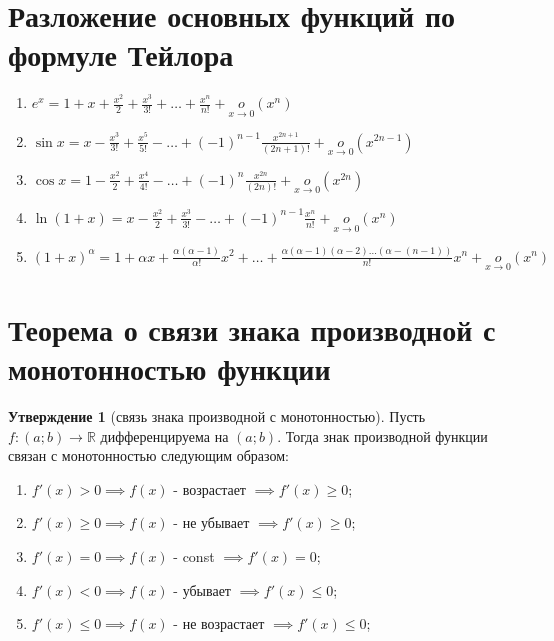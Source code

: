 \documentclass{report}
\theoremstyle{definition}
\newtheorem*{statement}{Утверждение}
\begin{document}
\section{Разложение основных функций по формуле Тейлора}

\begin{enumerate}
    \item $e^x = 1 + x + \frac{x^2}{2} + \frac{x^3}{3!} + \ldots + \frac{x^n}{n!} + \underset{x\rightarrow0}
              {o}(x^n)$
    \item $\sin x = x - \frac{x^3}{3!} + \frac{x^5}{5!} - \ldots + (-1)^{n-1}\frac{x^{2n+1}}{(2n+1)!} +
              \underset{x\rightarrow0}{o}(x^{2n-1})$
    \item $\cos x = 1 - \frac{x^2}{2} + \frac{x^4}{4!} - \ldots + (-1)^n\frac{x^{2n}}{(2n)!} +
              \underset{x\rightarrow0}{o}(x^{2n})$
    \item $\ln (1+x) = x - \frac{x^2}{2} + \frac{x^3}{3!} - \ldots + (-1)^{n-1}\frac{x^n}{n!} +
              \underset{x\rightarrow0}{o}(x^n)$
    \item $(1+x)^\alpha = 1 + \alpha x + \frac{\alpha (\alpha - 1)}{\alpha !} x^2 + \ldots +
              \frac{\alpha(\alpha-1)(\alpha-2)\ldots(\alpha - (n-1))}{n!}x^n + \underset{x\rightarrow0}{o}(x^n)$
\end{enumerate}

\section{Теорема о связи знака производной с монотонностью функции}

\begin{statement}[связь знака производной с монотонностью]
    Пусть $f:(a;b)\rightarrow\mathbb{R}$ дифференцируема на $(a;b)$. Тогда знак производной
    функции связан с монотонностью следующим образом:
    \begin{enumerate}
        \item $f'(x)>0 \implies f(x)$ - возрастает $\implies f'(x) \geqslant 0$;
        \item $f'(x)\geqslant0 \implies f(x)$ - не убывает $\implies f'(x) \geqslant 0$;
        \item $f'(x)=0 \implies f(x)$ - const $\implies f'(x) = 0$;
        \item $f'(x)<0 \implies f(x)$ - убывает $\implies f'(x) \leqslant 0$;
        \item $f'(x)\leqslant0 \implies f(x)$ - не возрастает $\implies f'(x) \leqslant 0$;
    \end{enumerate}
\end{statement}
\end{document}
